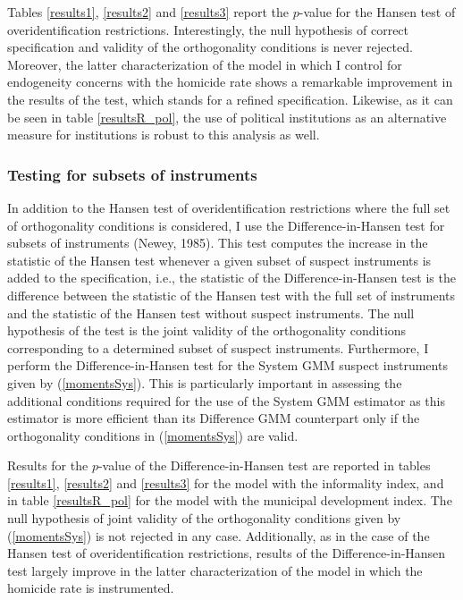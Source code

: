 \documentclass[a4paper, 12pt]{article}
\begin{document}
Tables \ref{results1}, \ref{results2} and \ref{results3} report the $p$-value for the Hansen test of overidentification restrictions. Interestingly, the null hypothesis of correct specification and validity of the orthogonality conditions is never rejected. Moreover, the latter characterization of the model in which I control for endogeneity concerns with the homicide rate shows a remarkable improvement in the results of the test, which stands for a refined specification. Likewise, as it can be seen in table \ref{resultsR_pol}, the use of political institutions as an alternative measure for institutions is robust to this analysis as well.

\subsubsection*{Testing for subsets of instruments}

In addition to the Hansen test of overidentification restrictions where the full set of orthogonality conditions is considered, I use the Difference-in-Hansen test for subsets of instruments (Newey, 1985). This test computes the increase in the statistic of the Hansen test whenever a given subset of suspect instruments is added to the specification, i.e., the statistic of the Difference-in-Hansen test is the difference between the statistic of the Hansen test with the full set of instruments and the statistic of the Hansen test without suspect instruments. The null hypothesis of the test is the joint validity of the orthogonality conditions corresponding to a determined subset of suspect instruments. Furthermore, I perform the Difference-in-Hansen test for the System GMM suspect instruments given by (\ref{momentsSys}). This is particularly important in assessing the additional conditions required for the use of the System GMM estimator as this estimator is more efficient than its Difference GMM counterpart only if the orthogonality conditions in (\ref{momentsSys}) are valid.

Results for the $p$-value of the Difference-in-Hansen test are reported in tables \ref{results1}, \ref{results2} and \ref{results3} for the model with the informality index, and in table \ref{resultsR_pol} for the model with the municipal development index. The null hypothesis of joint validity of the orthogonality conditions given by (\ref{momentsSys}) is not rejected in any case. Additionally, as in the case of the Hansen test of overidentification restrictions, results of the Difference-in-Hansen test largely improve in the latter characterization of the model in which the homicide rate is instrumented.
\end{document}
